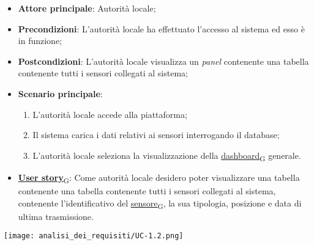 \begin{itemize}
	\item \textbf{Attore principale}: Autorità locale;
	\item \textbf{Precondizioni}: L'autorità locale ha effettuato l'accesso al sistema ed esso è in funzione;
	\item \textbf{Postcondizioni}: L'autorità locale visualizza un \textit{panel} contenente una tabella contenente tutti i sensori collegati al sistema;
	\item \textbf{Scenario principale}:
	      \begin{enumerate}
		      \item L'autorità locale accede alla piattaforma;
		      \item Il sistema carica i dati relativi ai sensori interrogando il database;
		      \item L'autorità locale seleziona la visualizzazione della \href{https://7last.github.io/docs/rtb/documentazione-interna/glossario\#dashboard}{dashboard\textsubscript{G}} generale.
	      \end{enumerate}
	\item \href{https://7last.github.io/docs/rtb/documentazione-interna/glossario\#user-story}{\textbf{User story}\textsubscript{G}}: Come autorità locale desidero poter visualizzare una tabella contenente una tabella contenente tutti i sensori collegati al sistema,
	      contenente l'identificativo del \href{https://7last.github.io/docs/rtb/documentazione-interna/glossario\#sensore}{sensore\textsubscript{G}}, la sua tipologia, posizione e data di ultima trasmissione.
\end{itemize}

\begin{center}
	\texttt{[image: analisi\_dei\_requisiti/UC-1.2.png]}
\end{center}

